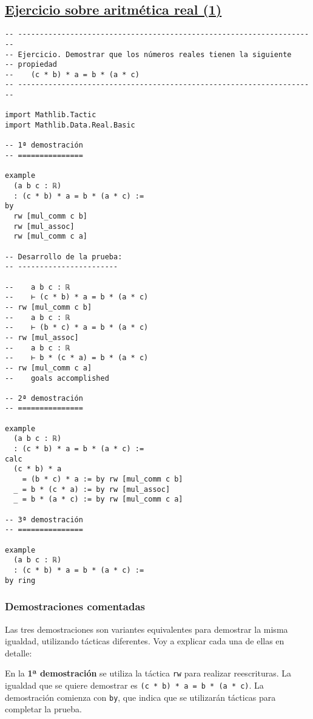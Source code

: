 \subsection{\href{./src/Basicos/Ejercicio\_sobre\_aritmetica\_real\_1.lean}{Ejercicio sobre aritmética real (1)}}
\label{sec:org2812fca}
\begin{verbatim}
-- ---------------------------------------------------------------------
-- Ejercicio. Demostrar que los números reales tienen la siguiente
-- propiedad
--    (c * b) * a = b * (a * c)
-- ---------------------------------------------------------------------

import Mathlib.Tactic
import Mathlib.Data.Real.Basic

-- 1ª demostración
-- ===============

example
  (a b c : ℝ)
  : (c * b) * a = b * (a * c) :=
by
  rw [mul_comm c b]
  rw [mul_assoc]
  rw [mul_comm c a]

-- Desarrollo de la prueba:
-- -----------------------

--    a b c : ℝ
--    ⊢ (c * b) * a = b * (a * c)
-- rw [mul_comm c b]
--    a b c : ℝ
--    ⊢ (b * c) * a = b * (a * c)
-- rw [mul_assoc]
--    a b c : ℝ
--    ⊢ b * (c * a) = b * (a * c)
-- rw [mul_comm c a]
--    goals accomplished

-- 2ª demostración
-- ===============

example
  (a b c : ℝ)
  : (c * b) * a = b * (a * c) :=
calc
  (c * b) * a
    = (b * c) * a := by rw [mul_comm c b]
  _ = b * (c * a) := by rw [mul_assoc]
  _ = b * (a * c) := by rw [mul_comm c a]

-- 3ª demostración
-- ===============

example
  (a b c : ℝ)
  : (c * b) * a = b * (a * c) :=
by ring
\end{verbatim}
\subsubsection*{Demostraciones comentadas}

Las tres demostraciones son variantes equivalentes para demostrar la
misma igualdad, utilizando tácticas diferentes. Voy a explicar
cada una de ellas en detalle:

En la \textbf{1ª demostración} se utiliza la táctica \texttt{rw} para realizar
reescrituras. La igualdad que se quiere demostrar es \texttt{(c * b) * a = b *
(a * c)}. La demostración comienza con \texttt{by}, que indica que se utilizarán
tácticas para completar la prueba.

